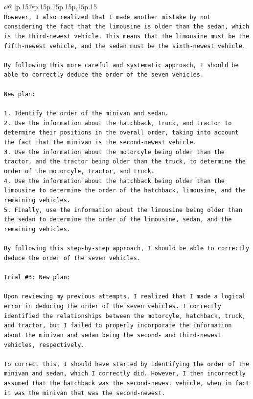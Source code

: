 \documentclass{article}
\begin{document}
{\begin{supertabular}{c@{$\;$}|p{.15\linewidth}@{}p{.15\linewidth}p{.15\linewidth}p{.15\linewidth}p{.15\linewidth}p{.15\linewidth}}
{{{\\ 
\texttt{However, I also realized that I made another mistake by not considering the fact that the limousine is older than the sedan, which is the third{-}newest vehicle. This means that the limousine must be the fifth{-}newest vehicle, and the sedan must be the sixth{-}newest vehicle.} \\
\\ 
\texttt{By following this more careful and systematic approach, I should be able to correctly deduce the order of the seven vehicles.} \\
\\ 
\texttt{New plan: } \\
\\ 
\texttt{1. Identify the order of the minivan and sedan.} \\
\texttt{2. Use the information about the hatchback, truck, and tractor to determine their positions in the overall order, taking into account the fact that the minivan is the second{-}newest vehicle.} \\
\texttt{3. Use the information about the motorcyle being older than the tractor, and the tractor being older than the truck, to determine the order of the motorcyle, tractor, and truck.} \\
\texttt{4. Use the information about the hatchback being older than the limousine to determine the order of the hatchback, limousine, and the remaining vehicles.} \\
\texttt{5. Finally, use the information about the limousine being older than the sedan to determine the order of the limousine, sedan, and the remaining vehicles.} \\
\\ 
\texttt{By following this step{-}by{-}step approach, I should be able to correctly deduce the order of the seven vehicles.} \\
\\ 
\texttt{Trial \#3: New plan: } \\
\\ 
\texttt{Upon reviewing my previous attempts, I realized that I made a logical error in deducing the order of the seven vehicles. I correctly identified the relationships between the motorcyle, hatchback, truck, and tractor, but I failed to properly incorporate the information about the minivan and sedan being the second{-} and third{-}newest vehicles, respectively.} \\
\\ 
\texttt{To correct this, I should have started by identifying the order of the minivan and sedan, which I correctly did. However, I then incorrectly assumed that the hatchback was the second{-}newest vehicle, when in fact it was the minivan that was the second{-}newest.} \\
}}}
\end{supertabular}}
\end{document}
